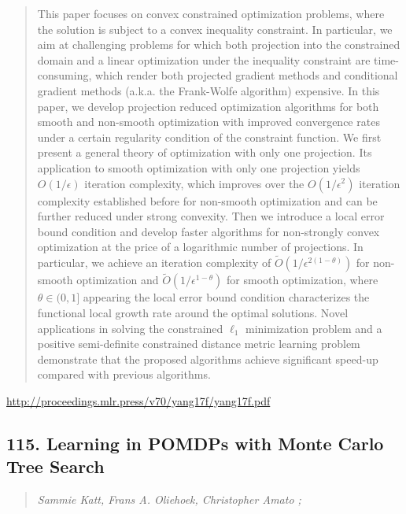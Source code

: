 \documentclass{article}
\begin{document}
\begin{quote}
    This paper focuses on convex constrained optimization problems, where the solution is subject to a convex inequality constraint. In particular, we aim at challenging problems for which both projection into the constrained domain and a linear optimization under the inequality constraint are time-consuming, which render both projected gradient methods and conditional gradient methods (a.k.a. the Frank-Wolfe algorithm) expensive. In this paper, we develop projection reduced optimization algorithms for both smooth and non-smooth optimization with improved convergence rates under a certain regularity condition of the constraint function. We first present a general theory of optimization with only one projection. Its application to smooth optimization with only one projection yields $O(1/\epsilon)$ iteration complexity, which improves over the $O(1/\epsilon^2)$ iteration complexity established before for non-smooth optimization and can be further reduced under strong convexity. Then we introduce a local error bound condition and develop faster algorithms for non-strongly convex optimization at the price of a logarithmic number of projections. In particular, we achieve an iteration complexity of $\widetilde O(1/\epsilon^{2(1-\theta)})$ for non-smooth optimization and $\widetilde O(1/\epsilon^{1-\theta})$ for smooth optimization, where $\theta\in(0,1]$ appearing the local error bound condition characterizes the functional local growth rate around the optimal solutions. Novel applications in solving the constrained $\ell_1$ minimization problem and a positive semi-definite constrained distance metric learning problem demonstrate that the proposed algorithms achieve significant speed-up compared with previous algorithms.  \end{quote}

\href{http://proceedings.mlr.press/v70/yang17f/yang17f.pdf}{http://proceedings.mlr.press/v70/yang17f/yang17f.pdf}

\subsection{115. Learning in POMDPs with Monte Carlo Tree Search}

\begin{quote}
\footnotesize{\textit{Sammie Katt, Frans A. Oliehoek, Christopher Amato ;}}
\end{quote}
\end{document}

